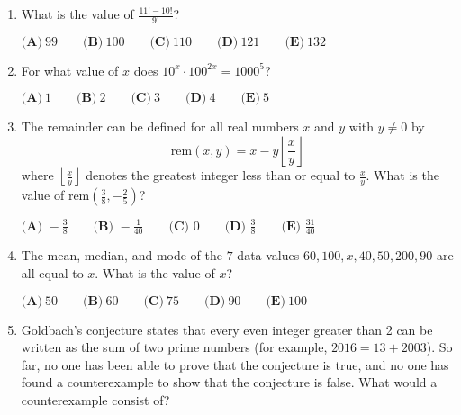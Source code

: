 \documentclass{article}
\begin{document}
\begin{enumerate}[label=\arabic*., itemsep=0.5em]\item What is the value of \(\frac{11!-10!}{9!}\)?

\(\textbf{(A)}\ 99\qquad\textbf{(B)}\ 100\qquad\textbf{(C)}\ 110\qquad\textbf{(D)}\ 121\qquad\textbf{(E)}\ 132\)\par \vspace{0.5em}\item For what value of \(x\) does \(10^x \cdot 100^{2x} = 1000^5\)?

\(\textbf{(A)}\ 1\qquad\textbf{(B)}\ 2\qquad\textbf{(C)}\ 3\qquad\textbf{(D)}\ 4\qquad\textbf{(E)}\ 5\)\par \vspace{0.5em}\item The remainder can be defined for all real numbers \(x\) and \(y\) with \(y \neq 0\) by 
\begin{equation*}
\text{rem} (x ,y)=x-y\left \lfloor \frac{x}{y} \right \rfloor
\end{equation*}
where \(\left \lfloor \tfrac{x}{y} \right \rfloor\) denotes the greatest integer less than or equal to \(\tfrac{x}{y}\). What is the value of \(\text{rem} (\tfrac{3}{8}, -\tfrac{2}{5} )\)?

\(\textbf{(A) } -\frac{3}{8} \qquad \textbf{(B) } -\frac{1}{40} \qquad \textbf{(C) } 0 \qquad \textbf{(D) } \frac{3}{8} \qquad \textbf{(E) } \frac{31}{40}\)\par \vspace{0.5em}\item The mean, median, and mode of the \(7\) data values \(60, 100, x, 40, 50, 200, 90\) are all equal to \(x\). What is the value of \(x\)?

\(\textbf{(A)}\ 50\qquad\textbf{(B)}\ 60\qquad\textbf{(C)}\ 75\qquad\textbf{(D)}\ 90\qquad\textbf{(E)}\ 100\)\par \vspace{0.5em}\item Goldbach's conjecture states that every even integer greater than 2 can be written as the sum of two prime numbers (for example, \(2016=13+2003\)). So far, no one has been able to prove that the conjecture is true, and no one has found a counterexample to show that the conjecture is false. What would a counterexample consist of?


\end{enumerate}
\end{document}
